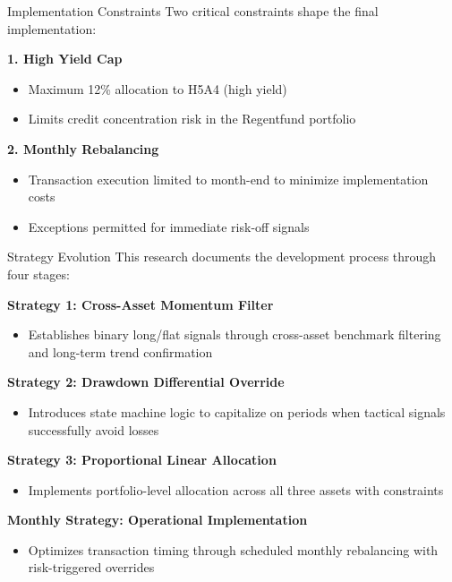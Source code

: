 \documentclass[aspectratio=169,10pt]{beamer}
\begin{document}
\begin{frame}{Implementation Constraints}
Two critical constraints shape the final implementation:

\vspace{0.4cm}

\textbf{1. High Yield Cap}
\begin{itemize}
    \item Maximum 12\% allocation to H5A4 (high yield)
    \item Limits credit concentration risk in the Regentfund portfolio
\end{itemize}

\vspace{0.4cm}

\textbf{2. Monthly Rebalancing}
\begin{itemize}
    \item Transaction execution limited to month-end to minimize implementation costs
    \item Exceptions permitted for immediate risk-off signals
\end{itemize}
\end{frame}

\begin{frame}{Strategy Evolution}
This research documents the development process through four stages:

\vspace{0.4cm}

\textbf{Strategy 1: Cross-Asset Momentum Filter}
\begin{itemize}
    \item Establishes binary long/flat signals through cross-asset benchmark filtering and long-term trend confirmation
\end{itemize}

\vspace{0.3cm}

\textbf{Strategy 2: Drawdown Differential Override}
\begin{itemize}
    \item Introduces state machine logic to capitalize on periods when tactical signals successfully avoid losses
\end{itemize}

\vspace{0.3cm}

\textbf{Strategy 3: Proportional Linear Allocation}
\begin{itemize}
    \item Implements portfolio-level allocation across all three assets with constraints
\end{itemize}

\vspace{0.3cm}

\textbf{Monthly Strategy: Operational Implementation}
\begin{itemize}
    \item Optimizes transaction timing through scheduled monthly rebalancing with risk-triggered overrides
\end{itemize}
\end{frame}
\end{document}

